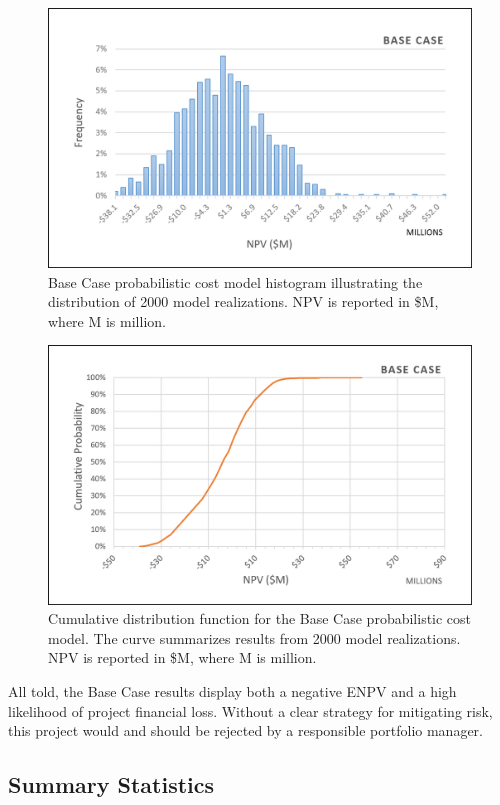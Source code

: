 \begin{figure}[!htp]
\centering
\includegraphics[width=.85\textwidth]{templates/images/Figure-Base_Case_Histogram.png}
\caption[Base Case histogram]{Base Case probabilistic cost model histogram illustrating the distribution of 2000 model realizations. NPV is reported in \$M, where M is million.}
\label{fig:base_case_hist}
\end{figure}

\begin{figure}[!htp]
\centering
\includegraphics[width=.85\textwidth]{templates/images/Figure-Base_Case_CDF.png}
\caption[Base Case CDF]{Cumulative distribution function for the Base Case probabilistic cost model. The curve summarizes results from 2000 model realizations. NPV is reported in \$M, where M is million.}
\label{fig:base_case_cdf}
\end{figure}

All told, the Base Case results display both a negative ENPV and a high likelihood of project financial loss. Without a clear strategy for mitigating risk, this project would and should be rejected by a responsible portfolio manager.

\subsection{Summary Statistics}
\label{ch6:base_stats}

